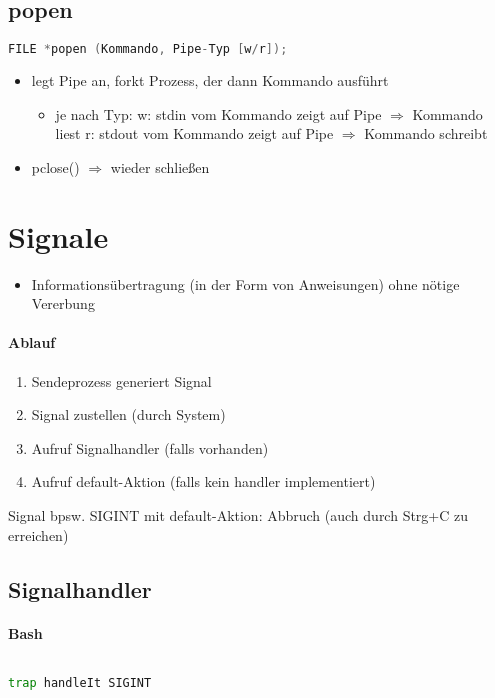 \documentclass{scrreprt}
\begin{document}
\subsection{popen}
\begin{lstlisting}[language=C]
FILE *popen (Kommando, Pipe-Typ [w/r]);
\end{lstlisting}
\begin{itemize}
\item legt Pipe an, forkt Prozess, der dann Kommando ausführt
\begin{itemize}
\item je nach Typ:
w: stdin vom Kommando zeigt auf Pipe $\Rightarrow$ Kommando liest
r: stdout vom Kommando zeigt auf Pipe $\Rightarrow$ Kommando schreibt
\end{itemize}
\item pclose() $\Rightarrow$ wieder schließen
\end{itemize}

\section{Signale}
\begin{itemize}
\item Informationsübertragung (in der Form von Anweisungen) ohne nötige Vererbung
\end{itemize}
\paragraph{Ablauf}
\begin{enumerate}
\item Sendeprozess generiert Signal
\item Signal zustellen (durch System)
\item Aufruf Signalhandler (falls vorhanden)
\item Aufruf default-Aktion (falls kein handler implementiert)
\end{enumerate}
Signal bpsw. SIGINT mit default-Aktion: Abbruch (auch durch Strg+C zu erreichen)
\subsection{Signalhandler}
\paragraph{Bash} $ $
\begin{lstlisting}[language=bash]
trap handleIt SIGINT
\end{lstlisting}
\end{document}

